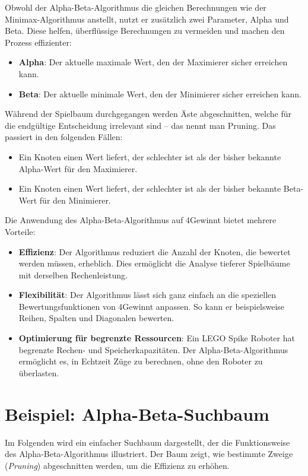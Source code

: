 Obwohl der Alpha-Beta-Algorithmus die gleichen Berechnungen wie der Minimax-Algorithmus anstellt, nutzt er zusätzlich zwei Parameter, Alpha und Beta. Diese helfen, überflüssige Berechnungen zu vermeiden und machen den Prozess effizienter:

\begin{itemize}
	\item \textbf{Alpha}: Der aktuelle maximale Wert, den der Maximierer sicher erreichen kann.
	\item \textbf{Beta}: Der aktuelle minimale Wert, den der Minimierer sicher erreichen kann.
\end{itemize}

Während der Spielbaum durchgegangen werden Äste abgeschnitten, welche für die endgültige Entscheidung irrelevant sind – das nennt man Pruning. Das passiert in den folgenden Fällen:
\begin{itemize}
	\item Ein Knoten einen Wert liefert, der schlechter ist als der bisher bekannte Alpha-Wert für den Maximierer.
	\item Ein Knoten einen Wert liefert, der schlechter ist als der bisher bekannte Beta-Wert für den Minimierer.
\end{itemize}

Die Anwendung des Alpha-Beta-Algorithmus auf 4Gewinnt bietet mehrere Vorteile:
\begin{itemize}
	\item \textbf{Effizienz}: Der Algorithmus reduziert die Anzahl der Knoten, die bewertet werden müssen, erheblich. Dies ermöglicht die Analyse tieferer Spielbäume mit derselben Rechenleistung.
	\item \textbf{Flexibilität}: Der Algorithmus lässt sich ganz einfach an die speziellen Bewertungsfunktionen von 4Gewinnt anpassen. So kann er beispielsweise Reihen, Spalten und Diagonalen bewerten.
	\item \textbf{Optimierung für begrenzte Ressourcen}: Ein LEGO Spike Roboter hat begrenzte Rechen- und Speicherkapazitäten. Der Alpha-Beta-Algorithmus ermöglicht es, in Echtzeit Züge zu berechnen, ohne den Roboter zu überlasten.
\end{itemize}

\section*{Beispiel: Alpha-Beta-Suchbaum}

Im Folgenden wird ein einfacher Suchbaum dargestellt, der die Funktionsweise des Alpha-Beta-Algorithmus illustriert. Der Baum zeigt, wie bestimmte Zweige (\textit{Pruning}) abgeschnitten werden, um die Effizienz zu erhöhen.

